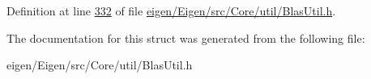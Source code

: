 Definition at line \hyperlink{eigen_2_eigen_2src_2_core_2util_2_blas_util_8h_source_l00332}{332} of file \hyperlink{eigen_2_eigen_2src_2_core_2util_2_blas_util_8h_source}{eigen/\+Eigen/src/\+Core/util/\+Blas\+Util.\+h}.



The documentation for this struct was generated from the following file\+:\begin{DoxyCompactItemize}
\item 
eigen/\+Eigen/src/\+Core/util/\+Blas\+Util.\+h\end{DoxyCompactItemize}
